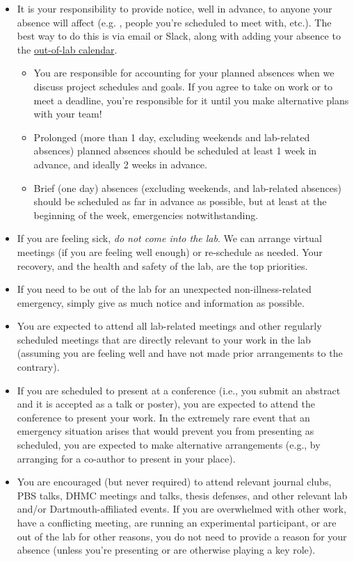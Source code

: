 \documentclass{tufte-book} %
\begin{document}
\begin{itemize}
\item It is your responsibility to provide notice, well in advance, to
  anyone your absence will affect (e.g. \director, people you're
  scheduled to meet with, etc.).  The best way to do this is via email
  or Slack, along with adding your absence to the
  \hyperref[sec: scheduling]{out-of-lab calendar}.
\begin{itemize}
\item You are responsible for accounting for your planned absences
  when we discuss project schedules and goals.  If you agree to take
  on work or to meet a deadline, you're responsible for it until you
  make alternative plans with your team!
\item Prolonged (more than 1 day, excluding weekends and
  lab-related absences) planned
  absences should be scheduled at least 1 week in advance, and ideally
  2 weeks in advance.
\item Brief (one day) absences (excluding weekends, and lab-related
  absences) should be scheduled as far in advance as possible, but at
  least at the beginning of the week, emergencies notwithstanding.
\end{itemize}

\item If you are feeling sick, \textit{do not come into the lab}.  We
  can arrange virtual meetings (if you are feeling well enough) or
  re-schedule as needed.  Your recovery, and the health and safety of
  the lab, are the top priorities.

\item If you need to be out of the lab for an unexpected
  non-illness-related emergency, simply give as much notice and
  information as possible.

\item You are expected to attend all lab-related meetings and other regularly
  scheduled meetings that are directly relevant to your work in the
  lab (assuming you are feeling well and have not made prior arrangements to the contrary).

\item If you are scheduled to present at a conference (i.e., you
  submit an abstract and it is accepted as a talk or poster), you are
  expected to attend the conference to present your work.  In the
  extremely rare event that an emergency situation arises that would
  prevent you from presenting as scheduled, you are expected to make
  alternative arrangements (e.g., by arranging for a co-author to
  present in your place).

\item You are encouraged (but never required) to attend
  relevant journal clubs, PBS talks, DHMC meetings and talks, thesis
  defenses, and other relevant lab and/or Dartmouth-affiliated events.
  If you are overwhelmed with other work, have a conflicting meeting,
  are running an experimental participant, or are out of the lab for
  other reasons, you do not need to provide a reason for your absence
  (unless you're presenting or are otherwise playing a key role).
\end{itemize}
\end{document}
